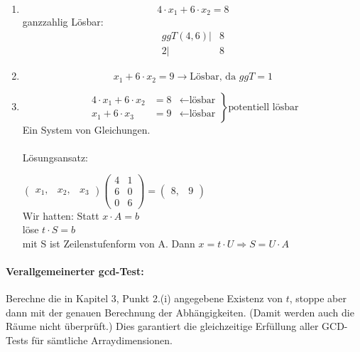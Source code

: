 \begin{enumerate}
  \item {
      \[4 \cdot x_1 + 6 \cdot x_2 = 8 \]
      ganzzahlig Lösbar: \\
      \begin{align*}
         ggT(4,6) |& 8\\
               2  |& 8
      \end{align*}
    }
  \item {\[x_1 + 6 \cdot x_2 = 9 \rightarrow \text{Lösbar, da } ggT = 1 \]}
  \item { 
      \[ \left. 
          \begin{split}
            4 \cdot x_1 + 6 \cdot x_2 &= 8 &\leftarrow \text{lösbar}\\
            x_1 + 6 \cdot x_3 &= 9 &\leftarrow \text{lösbar}
          \end{split}
       \right\rbrace{\text{potentiell lösbar}} \] 
       Ein System von Gleichungen.\\
\\
       Lösungsansatz:

\( \begin{pmatrix}
    x_1 ,& x_2 ,& x_3
   \end{pmatrix}
   \begin{pmatrix}
     4 & 1\\
     6 & 0\\
     0 & 6
   \end{pmatrix}
=
   \begin{pmatrix}
     8 ,& 9
   \end{pmatrix}
\) \\
Wir hatten: Statt \(x \cdot A = b  \) \\
          löse \( t \cdot S = b \) \\
          mit S ist Zeilenstufenform von A.
          Dann \( x = t \cdot U \Rightarrow S = U \cdot A \)
        }         

\end{enumerate}

\smallskip

\paragraph{Verallgemeinerter gcd-Test:} Berechne die in Kapitel 3, Punkt 2.(i)
angegebene Existenz von $t$, stoppe aber dann mit der genauen
Berechnung der Abhängigkeiten. (Damit werden auch die Räume nicht
überprüft.)  Dies garantiert die gleichzeitige Erfüllung aller
GCD-Tests für sämtliche Arraydimensionen.

